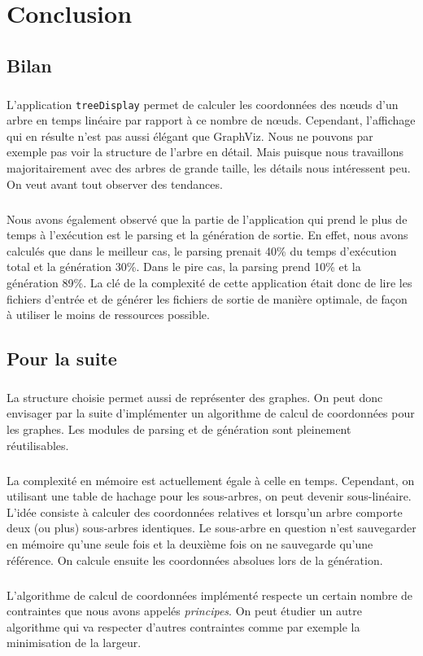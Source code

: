 \chapter{Conclusion}

\section{Bilan}
\paragraph{}L'application \verb|treeDisplay| permet de calculer les coordonnées des n\oe uds d'un arbre en temps linéaire par rapport à ce nombre de n\oe uds. Cependant, l'affichage qui en résulte n'est pas aussi élégant que GraphViz. Nous ne pouvons par exemple pas voir la structure de l'arbre en détail. Mais puisque nous travaillons majoritairement avec des arbres de grande taille, les détails nous intéressent peu. On veut avant tout observer des tendances. 
\paragraph{} Nous avons également observé que la partie de l'application qui prend le plus de temps à l'exécution est le parsing et la génération de sortie. En effet, nous avons calculés que dans le meilleur cas, le parsing prenait 40\% du temps d'exécution total et la génération 30\%. Dans le pire cas, la parsing prend 10\% et la génération 89\%. La clé de la complexité de cette application était donc de lire les fichiers d'entrée et de générer les fichiers de sortie de manière optimale, de façon à utiliser le moins de ressources possible.

\section{Pour la suite}

\paragraph{}La structure choisie permet aussi de représenter des graphes. On peut donc envisager par la suite d'implémenter un algorithme de calcul de coordonnées pour les graphes. Les modules de parsing et de génération sont pleinement réutilisables.

\paragraph{}La complexité en mémoire est actuellement égale à celle en temps. Cependant, on utilisant une table de hachage pour les sous-arbres, on peut devenir sous-linéaire. L'idée consiste à calculer des coordonnées relatives et lorsqu'un arbre comporte deux (ou plus) sous-arbres identiques. Le sous-arbre en question n'est sauvegarder en mémoire qu'une seule fois et la deuxième fois on ne sauvegarde qu'une référence. On calcule ensuite les coordonnées absolues lors de la génération.

\paragraph{}L'algorithme de calcul de coordonnées implémenté respecte un certain nombre de contraintes que nous avons appelés \emph{principes}. On peut étudier un autre algorithme qui va respecter d'autres contraintes comme par exemple la minimisation de la largeur.